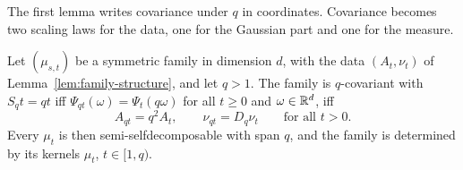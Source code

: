 The first lemma writes covariance under $q$ in \Levy{} coordinates. Covariance becomes two scaling
laws for the data, one for the Gaussian part and one for the \Levy{} measure.

\begin{lemma}
\label{lem:discrete-covariance-levy}

Let $(\mu_{s,t})$ be a symmetric family in dimension $d$, with the data $(A_t, \nu_t)$ of
Lemma~\ref{lem:family-structure}, and let $q > 1$. The family is $q$-covariant with $S_qt = qt$ iff
$\Psi_{qt}(\omega) = \Psi_t(q\omega)$ for all $t \ge 0$ and $\omega \in \mathbb{R}^d$, iff
\begin{equation}
\label{eq:discrete-covariance-levy}
  A_{qt} = q^2A_t, \qquad \nu_{qt} = D_q\nu_t \qquad \text{for all } t > 0.
\end{equation}
Every $\mu_t$ is then semi-selfdecomposable with span $q$, and the family is determined by its
kernels $\mu_t$, $t \in [1, q)$.
\end{lemma}

